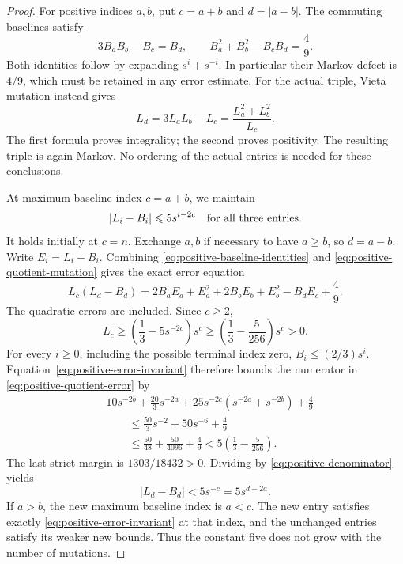 \begin{proof}
For positive indices $a,b$, put $c=a+b$ and $d=|a-b|$.
The commuting baselines satisfy
\begin{equation}\label{eq:positive-baseline-identities}
 3B_aB_b-B_c=B_d,
 \qquad B_a^2+B_b^2-B_cB_d=\frac49.
\end{equation}
Both identities follow by expanding $s^i+s^{-i}$. In particular their
Markov defect is $4/9$, which must be retained in any error estimate.
For the actual triple, Vieta mutation instead gives
\begin{equation}\label{eq:positive-quotient-mutation}
 L_d=3L_aL_b-L_c=\frac{L_a^2+L_b^2}{L_c}.
\end{equation}
The first formula proves integrality; the second proves positivity.
The resulting triple is again Markov. No ordering of the actual
entries is needed for these conclusions.

At maximum baseline index $c=a+b$, we maintain
\begin{equation}\label{eq:positive-error-invariant}
 |L_i-B_i|\leqslant5s^{i-2c}
 \quad\hbox{for all three entries}.
\end{equation}
It holds initially at $c=n$. Exchange $a,b$ if necessary to have
$a\geqslant b$, so $d=a-b$. Write $E_i=L_i-B_i$. Combining
\eqref{eq:positive-baseline-identities} and
\eqref{eq:positive-quotient-mutation} gives the exact error equation
\begin{equation}\label{eq:positive-quotient-error}
 L_c(L_d-B_d)
 =2B_aE_a+E_a^2+2B_bE_b+E_b^2-B_dE_c+\frac49.
\end{equation}
The quadratic errors are included. Since $c\geqslant2$,
\begin{equation}\label{eq:positive-denominator}
 L_c\geqslant\left(\frac13-5s^{-2c}\right)s^c
 \geqslant\left(\frac13-\frac5{256}\right)s^c>0.
\end{equation}
For every $i\geqslant0$, including the possible terminal index zero,
$B_i\leqslant(2/3)s^i$. Equation~\eqref{eq:positive-error-invariant}
therefore bounds the numerator in \eqref{eq:positive-quotient-error} by
\begin{align*}
 &10s^{-2b}+\frac{20}{3}s^{-2a}
   +25s^{-2c}(s^{-2a}+s^{-2b})+\frac49\\
 &\qquad\leqslant\frac{50}{3}s^{-2}+50s^{-6}+\frac49\\
 &\qquad\leqslant\frac{50}{48}+\frac{50}{4096}+\frac49
 <5\left(\frac13-\frac5{256}\right).
\end{align*}
The last strict margin is $1303/18432>0$. Dividing by
\eqref{eq:positive-denominator} yields
\begin{equation}\label{eq:positive-new-error}
 |L_d-B_d|<5s^{-c}=5s^{d-2a}.
\end{equation}
If $a>b$, the new maximum baseline index is $a<c$. The new entry
satisfies exactly \eqref{eq:positive-error-invariant} at that index,
and the unchanged entries satisfy its weaker new bounds. Thus the
constant five does not grow with the number of mutations.


\end{proof}

